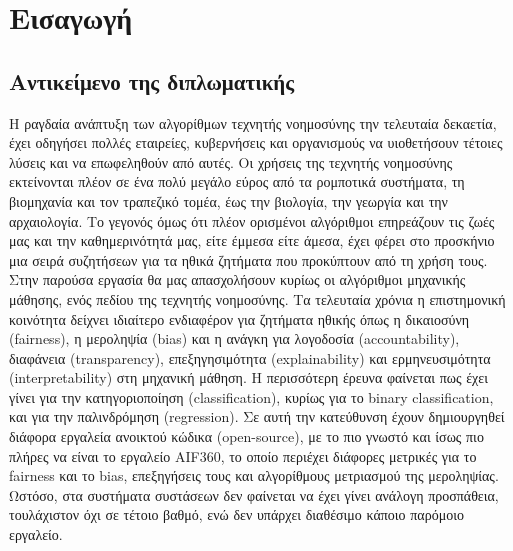 \chapter{Εισαγωγή}
\label{chap1}


\section{Αντικείμενο της διπλωματικής}

\noindent Η ραγδαία ανάπτυξη των αλγορίθμων τεχνητής νοημοσύνης την τελευταία δεκαετία, έχει οδηγήσει πολλές εταιρείες, κυβερνήσεις και οργανισμούς να υιοθετήσουν τέτοιες λύσεις και να επωφεληθούν από αυτές. Οι χρήσεις της τεχνητής νοημοσύνης εκτείνονται πλέον σε ένα πολύ μεγάλο εύρος από τα ρομποτικά συστήματα, τη βιομηχανία και τον τραπεζικό τομέα, έως την βιολογία, την γεωργία και την αρχαιολογία. Το γεγονός όμως ότι πλέον ορισμένοι αλγόριθμοι επηρεάζουν τις ζωές μας και την καθημερινότητά μας, είτε έμμεσα είτε άμεσα, έχει φέρει στο προσκήνιο μια σειρά συζητήσεων για τα ηθικά ζητήματα που προκύπτουν από τη χρήση τους. Στην παρούσα εργασία θα μας απασχολήσουν κυρίως οι αλγόριθμοι μηχανικής μάθησης, ενός πεδίου της τεχνητής νοημοσύνης. Τα τελευταία χρόνια η επιστημονική κοινότητα δείχνει ιδιαίτερο ενδιαφέρον για ζητήματα ηθικής όπως η δικαιοσύνη (fairness), η μεροληψία (bias) και η ανάγκη για λογοδοσία (accountability), διαφάνεια (transparency), επεξηγησιμότητα (explainability) και ερμηνευσιμότητα (interpretability) στη μηχανική μάθηση. Η περισσότερη έρευνα φαίνεται πως έχει γίνει για την κατηγοριοποίηση (classification), κυρίως για το binary classification, και για την παλινδρόμηση (regression). Σε αυτή την κατεύθυνση έχουν δημιουργηθεί διάφορα εργαλεία ανοικτού κώδικα (open-source), με το πιο γνωστό και ίσως πιο πλήρες να είναι το εργαλείο AIF360, το οποίο περιέχει διάφορες μετρικές για το fairness και το bias, επεξηγήσεις τους και  αλγορίθμους μετριασμού της μεροληψίας. Ωστόσο, στα συστήματα συστάσεων δεν φαίνεται να έχει γίνει ανάλογη προσπάθεια, τουλάχιστον όχι σε τέτοιο βαθμό, ενώ δεν υπάρχει διαθέσιμο κάποιο παρόμοιο εργαλείο.\\

